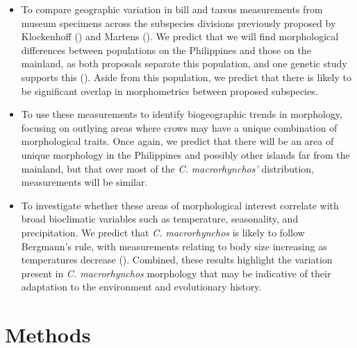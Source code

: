 \documentclass[10pt,a4paper]{article}
\begin{document}
\begin{itemize}
\item
  To compare geographic variation in bill and tarsus measurements from museum specimens across the subspecies divisions previously proposed by Klockenhoff () and Martens ().
  We predict that we will find morphological differences between populations on the Philippines and those on the mainland, as both proposals separate this population, and one genetic study supports this ().
  Aside from this population, we predict that there is likely to be significant overlap in morphometrics between proposed subspecies.
\item
  To use these measurements to identify biogeographic trends in morphology, focusing on outlying areas where crows may have a unique combination of morphological traits.
  Once again, we predict that there will be an area of unique morphology in the Philippines and possibly other islands far from the mainland, but that over most of the \emph{C. macrorhynchos'} distribution, measurements will be similar.
\item
  To investigate whether these areas of morphological interest correlate with broad bioclimatic variables such as temperature, seasonality, and precipitation.
  We predict that \emph{C. macrorhynchos} is likely to follow Bergmann's rule, with measurements relating to body size increasing as temperatures decrease ().
  Combined, these results highlight the variation present in \emph{C. macrorhynchos} morphology that may be indicative of their adaptation to the environment and evolutionary history.
\end{itemize}

\section{Methods}\label{methods}
\end{document}
